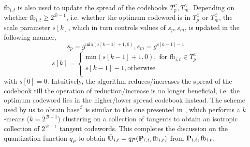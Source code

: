 \documentclass[conference]{IEEEtran}
\begin{document}
$\text{fb}_{i,t}$ is also used to update the spread of the codebooks $T^{\mathcal{C}}_p,T^{\mathcal{C}}_m$. 
Depending on whether $\text{fb}_{i,t} \geq 2^{\mathcal{B}-1}$,
i.e. whether the optimum codeword is in $T^{\mathcal{C}}_p$ or
$T^{\mathcal{C}}_m$, the scale parameter $s[k]$, which in turn
controls values of $s_p, s_m$, is updated in the following manner,
$$s_p=g^{\text{min}(s[k-1]+1,0)}, s_m = g^{s[k-1]-1}$$
$$
s[k]=
\begin{cases}
\text{min}(s[k-1]+1,0), \text{ for } \text{fb}_{i,t} \in T^{\mathcal{C}}_p\\
s[k-1]-1, \text{otherwise}\\
\end{cases}
$$
with $s[0]=0$. 
Intuitively, the algorithm reduces/increases the spread of the codebook till the operation of reduction/increase is no longer beneficial, i.e. the optimum codeword lies in the higher/lower spread codebook instead. 
The scheme used by us to obtain $\text{base}^{\mathcal{C}}$ is similar to the one presented in \cite{Gupt1905:Predictive}, which performs a $k$-means ($k=2^{\mathcal{B}-1}$) clustering on a collection of tangents to obtain an isotropic collection of $2^{\mathcal{B}-1}$ tangent codewords. 
This completes the discussion on the quantization function $q_P$ to obtain $\tilde{{\bf U}}_{i,t}=q_P({\bf P}_{i,t},\text{fb}_{i,t})$ from ${\bf P}_{i,t},\text{fb}_{i,t}$.
\end{document}
